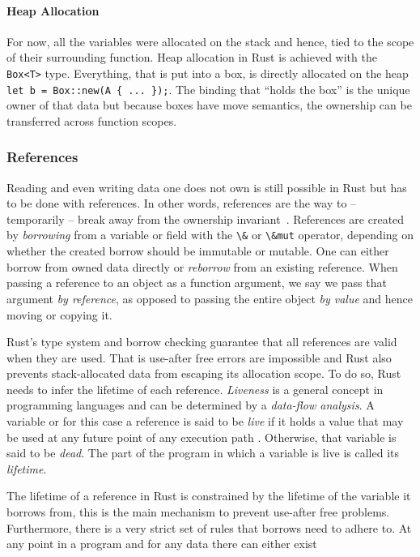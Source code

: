 \paragraph{Heap Allocation}

For now, all the variables were allocated on the stack and hence, tied to the
scope of their surrounding function. Heap allocation in Rust is achieved with
the \lstinline!Box<T>! type. Everything, that is put into a box, is directly
allocated on the heap \passthrough{\lstinline!let b = Box::new(A \{ ... \});!}.
The binding that ``holds the box'' is the unique owner  of that data but because
boxes have move semantics, the ownership can be transferred across function
scopes.

\subsubsection{References}

Reading and even writing data one does not own is still possible in Rust but has
to be done with references. In other words, references are the way to --
temporarily -- break away from the ownership
invariant~\cite{lightweight-formalism}. References are created by
\emph{borrowing} from a variable or field with the \lstinline!\&! or
\lstinline!\&mut! operator, depending on whether the created borrow should be
immutable or mutable. One can either borrow from owned data directly or
\emph{reborrow} from an existing reference. When passing a reference to an
object as a function argument, we say we pass that argument \emph{by reference},
as opposed to passing the entire object \emph{by value} and hence moving or
copying it.

Rust's type system and borrow checking guarantee that all references are valid
when they are used. That is use-after free errors are impossible and Rust also
prevents stack-allocated data from escaping its allocation scope. To do so, Rust
needs to infer the lifetime of each reference. \emph{Liveness} is a general
concept in programming languages and can be determined by a \emph{data-flow
analysis}. A variable or for this case a reference is said to be \emph{live} if
it holds a value that may be used at any future point of any execution path
\cite{wiki:live-vars}. Otherwise, that variable is said to be \emph{dead}. The
part of the program in which a variable is live is called its \emph{lifetime}.

The lifetime of a reference in Rust is constrained by the lifetime of the
variable it borrows from, this is the main  mechanism to prevent use-after free
problems. Furthermore, there is a very strict set of rules that borrows need to
adhere to. At any point in a program and for any data there can either exist

